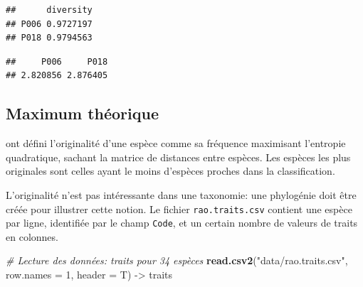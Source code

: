 \documentclass[
  11pt,
  french,
  a4paper,
  extrafontsizes,onecolumn,openright
  ]{memoir}
\newenvironment{Shaded}{\begin{snugshade}}{\end{snugshade}}
\newcommand{\CommentTok}[1]{\textcolor[rgb]{0.56,0.35,0.01}{\textit{#1}}}
\newcommand{\DataTypeTok}[1]{\textcolor[rgb]{0.13,0.29,0.53}{#1}}
\newcommand{\DecValTok}[1]{\textcolor[rgb]{0.00,0.00,0.81}{#1}}
\newcommand{\KeywordTok}[1]{\textcolor[rgb]{0.13,0.29,0.53}{\textbf{#1}}}
\newcommand{\NormalTok}[1]{#1}
\newcommand{\OperatorTok}[1]{\textcolor[rgb]{0.81,0.36,0.00}{\textbf{#1}}}
\newcommand{\StringTok}[1]{\textcolor[rgb]{0.31,0.60,0.02}{#1}}
\begin{document}
\scriptsize

\begin{Shaded}
\end{Shaded}

\begin{verbatim}
##      diversity
## P006 0.9727197
## P018 0.9794563
\end{verbatim}

\begin{Shaded}
\end{Shaded}

\begin{verbatim}
##     P006     P018 
## 2.820856 2.876405
\end{verbatim}

\normalsize

\hypertarget{sec-MaxTheorique}{%
\subsection{Maximum théorique}\label{sec-MaxTheorique}}

\textcite{Pavoine2005a} ont défini l'originalité d'une espèce comme sa fréquence maximisant l'entropie quadratique, sachant la matrice de distances entre espèces.
Les espèces les plus originales sont celles ayant le moins d'espèces proches dans la classification.

L'originalité n'est pas intéressante dans une taxonomie: une phylogénie doit être créée pour illustrer cette notion.
Le fichier \texttt{rao.traits.csv} contient une espèce par ligne, identifiée par le champ \texttt{Code}, et un certain nombre de valeurs de traits en colonnes.

\scriptsize

\begin{Shaded}
\begin{Highlighting}[]
\CommentTok{# Lecture des données: traits pour 34 espèces}
\KeywordTok{read.csv2}\NormalTok{(}\StringTok{"data/rao.traits.csv"}\NormalTok{, }\DataTypeTok{row.names =} \DecValTok{1}\NormalTok{, }\DataTypeTok{header =}\NormalTok{ T) ->}
\StringTok{    }\NormalTok{traits}
\end{Highlighting}
\end{Shaded}
\end{document}
